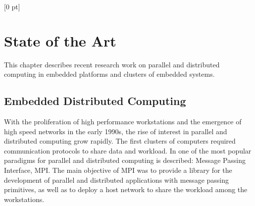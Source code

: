 \titlespacing{\chapter}{0 pt}{30 pt}{50 pt}[0 pt]
\titleformat{\section}{\Large\bfseries}{\thesection}{0 pt}{\hspace{30 pt}}
\titleformat{\subsection}{\large\bfseries}{\thesubsection}{0 pt}{\hspace{30 pt}}
\pagestyle{fancy}
\fancyhead[LO,LE]{\footnotesize\textit{\leftmark}}
\fancyhead[RO,RE]{\thepage}
\fancyfoot[CO,CE]{}

\chapter{State of the Art} %

\normalsize

\noindent

This chapter describes recent research work on parallel and distributed 
computing in embedded platforms and clusters of embedded systems.

\section{Embedded Distributed Computing}

With the proliferation of high performance workstations and the emergence of
high speed networks in the early 1990s, the rise of interest in parallel and
distributed computing grow rapidly. The first clusters of computers required
communication protocols to share data and workload. In \cite{Salim} one of the
most popular paradigms for parallel and distributed computing is described:
Message Passing Interface, MPI. The main objective of MPI was to provide a
library for the development of parallel and distributed applications with
message passing primitives, as well as to deploy a host network to share the
workload among the workstations.

